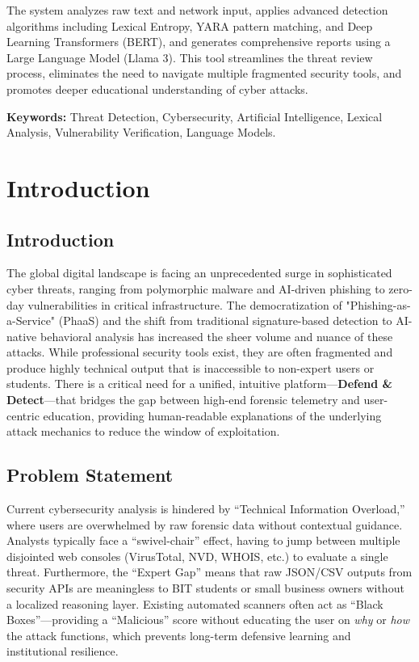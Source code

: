 \documentclass[12pt,a4paper]{report}
\begin{document}
The system analyzes raw text and network input, applies advanced detection algorithms including Lexical Entropy, YARA pattern matching, and Deep Learning Transformers (BERT), and generates comprehensive reports using a Large Language Model (Llama 3). This tool streamlines the threat review process, eliminates the need to navigate multiple fragmented security tools, and promotes deeper educational understanding of cyber attacks.

\vspace{0.5cm}
\noindent
\textbf{Keywords:} Threat Detection, Cybersecurity, Artificial Intelligence, Lexical Analysis, Vulnerability Verification, Language Models.

\newpage
\tableofcontents
\newpage


\chapter{Introduction}
\section{Introduction}
The global digital landscape is facing an unprecedented surge in sophisticated cyber threats, ranging from polymorphic malware and AI-driven phishing to zero-day vulnerabilities in critical infrastructure. The democratization of "Phishing-as-a-Service" (PhaaS) and the shift from traditional signature-based detection to AI-native behavioral analysis has increased the sheer volume and nuance of these attacks. While professional security tools exist, they are often fragmented and produce highly technical output that is inaccessible to non-expert users or students. There is a critical need for a unified, intuitive platform—\textbf{Defend \& Detect}—that bridges the gap between high-end forensic telemetry and user-centric education, providing human-readable explanations of the underlying attack mechanics to reduce the window of exploitation.

\section{Problem Statement}
Current cybersecurity analysis is hindered by ``Technical Information Overload,'' where users are overwhelmed by raw forensic data without contextual guidance. Analysts typically face a ``swivel-chair'' effect, having to jump between multiple disjointed web consoles (VirusTotal, NVD, WHOIS, etc.) to evaluate a single threat. Furthermore, the ``Expert Gap'' means that raw JSON/CSV outputs from security APIs are meaningless to BIT students or small business owners without a localized reasoning layer. Existing automated scanners often act as ``Black Boxes''---providing a ``Malicious'' score without educating the user on \textit{why} or \textit{how} the attack functions, which prevents long-term defensive learning and institutional resilience.
\end{document}
